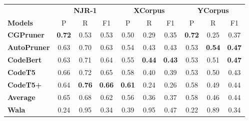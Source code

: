 \begin{tabular}{@{}lccccccccc@{}}
\toprule
& \multicolumn{3}{c}{\textbf{NJR-1}} & \multicolumn{3}{c}{\textbf{XCorpus}} & \multicolumn{3}{c}{\textbf{YCorpus}} \\
\cmidrule(lr){2-4} \cmidrule(lr){5-7} \cmidrule(lr){8-10}
{\bf Models} & P & R & F1 & P & R & F1 & P & R & F1 \\
\midrule
\textbf{CGPruner} &  \textbf{0.72} & 0.53 & 0.53 & 0.50 & 0.29 & 0.35 & \textbf{0.72} & 0.25 & 0.37 \\
\textbf{AutoPruner} & 0.63 & 0.70 & 0.63 & 0.54 & 0.43 & 0.43 & 0.53 & \textbf{0.54} & \textbf{0.47} \\
\textbf{CodeBert} & 0.63 & 0.71 & 0.64 & 0.55 & \textbf{0.44} & \textbf{0.43} & 0.53 & 0.51 & \textbf{0.47} \\
\textbf{CodeT5} & 0.66 & 0.72 & 0.65 & 0.58 & 0.40 & 0.39 & 0.53 & 0.50 & 0.43 \\
\textbf{CodeT5+} & 0.64 & \textbf{0.76} & \textbf{0.66} & \textbf{0.61} & 0.24 & 0.26 & 0.58 & 0.49 & 0.44 \\
\midrule
\textbf{Average} & 0.65 & 0.68 & 0.62 & 0.56 & 0.36 & 0.37 & 0.58 & 0.46 & 0.44 \\
\midrule
\textbf{Wala} & 0.24 & 0.95 & 0.34 & 0.39 & 0.95 & 0.47 & 0.22 & 0.89 & 0.34 \\
\bottomrule
\end{tabular}